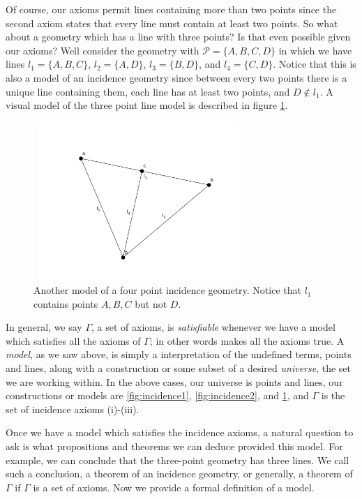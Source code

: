 \documentclass[12pt]{book}
\begin{document}
Of course, our axioms permit lines containing more than two points since the second axiom states that every line must contain at least two points. So what about a geometry which has a line with three points? Is that even possible given our axioms?  Well consider the geometry with $\mathscr{P}=\{A,B,C,D\}$ in which we have lines $l_1=\{A,B,C\}$, $l_2=\{A,D\}$, $l_3=\{B,D\}$, and $l_4=\{C,D\}$. Notice that this is also a model of an incidence geometry since between every two points there is a unique line containing them, each line has at least two points, and $D\notin l_1$. A visual model of the three point line model is described in figure \ref{fig:incidence3}.


\begin{figure}[H]
	\centering
	\includegraphics[width=8cm, height=6cm]{images/4pointincidence-b}
	\caption{Another model of a four point incidence geometry. Notice that $l_1$ contains points $A,B,C$ but not $D$.}
	\label{fig:incidence3}
\end{figure}

In general, we say $\Gamma$, a set of axioms, is \textit{satisfiable} whenever we have a model which satisfies all the axioms of $\Gamma$; in other words makes all the axioms true. A \textit{model}, as we saw above, is simply a interpretation of the undefined terms, points and lines, along with a construction or some subset of a desired \textit{universe}, the set we are working within. In the above cases, our universe is points and lines, our constructions or models are \ref{fig:incidence1}, \ref{fig:incidence2}, and \ref{fig:incidence3}, and $\Gamma$ is the set of incidence axioms (i)-(iii). 

Once we have a model which satisfies the incidence axioms, a natural question to ask is what propositions and theorems we can deduce provided this model. For example, we can conclude that the three-point geometry has three lines. We call such a conclusion, a theorem of an incidence geometry, or generally, a theorem of $\Gamma$ if $\Gamma$ is a set of axioms. Now we provide a formal definition of a model.\\
\end{document}
